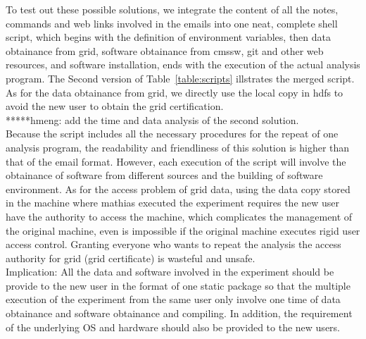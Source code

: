 \documentclass{article}
\begin{document}
To test out these possible solutions, we integrate the content of all the notes, commands and web links involved in the emails into one neat, complete shell script, which begins with the definition of environment variables, then data obtainance from grid, software obtainance from cmssw, git and other web resources, and software installation, ends with the execution of the actual analysis program. The Second version of Table~\ref{table:scripts} illstrates the merged script. As for the data obtainance from grid, we directly use the local copy in hdfs to avoid the new user to obtain the grid certification.\\

*****hmeng: add the time and data analysis of the second solution.\\

Because the script includes all the necessary procedures for the repeat of one analysis program, the readability and friendliness of this solution is higher than that of the email format. However, each execution of the script will involve the obtainance of software from different sources and the building of software environment. As for the access problem of grid data, using the data copy stored in the machine where mathias executed the experiment requires the new user have the authority to access the machine, which complicates the management of the original machine, even is impossible if the original machine executes rigid user access control. Granting everyone who wants to repeat the analysis the access authority for grid (grid certificate) is wasteful and unsafe. \\

Implication: All the data and software involved in the experiment should be provide to the new user in the format of one static package so that the multiple execution of the experiment from the same user only involve one time of data obtainance and software obtainance and compiling. In addition, the requirement of the underlying OS and hardware should also be provided to the new users.
\end{document}
